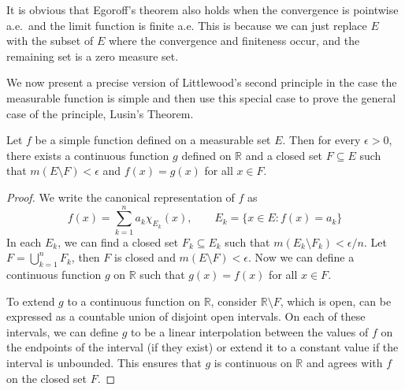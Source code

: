 \documentclass[../main.tex]{subfiles}
\begin{document}
\begin{remark}
	It is obvious that Egoroff's theorem also holds when the convergence is pointwise a.e.\ and the limit function is finite a.e. This is because we can just replace $E$ with the subset of $E$ where the convergence and finiteness occur, and the remaining set is a zero measure set.
\end{remark}

We now present a precise version of Littlewood's second principle in the case the measurable function is simple and then use this special case to prove the general case of the principle, Lusin's Theorem.

\begin{proposition}{}{}
	Let $f$ be a simple function defined on a measurable set $E$. Then for every $\epsilon > 0$, there exists a continuous function $g$ defined on $\mathbb{R}$ and a closed set $F \subseteq E$ such that $m(E \setminus F) < \epsilon$ and $f(x) = g(x)$ for all $x \in F$.
\end{proposition}
\begin{proof}
	We write the canonical representation of $f$ as
	\begin{equation*}
		f(x) = \sum_{k=1}^{n} a_k \chi_{E_k}(x), \qquad E_k = \{x \in E : f(x) = a_k\}
	\end{equation*}
	In each $E_k$, we can find a closed set $F_k \subseteq E_k$ such that $m(E_k \setminus F_k) < \epsilon/n$. Let $F = \bigcup_{k=1}^{n} F_k$, then $F$ is closed and $m(E \setminus F) < \epsilon$. Now we can define a continuous function $g$ on $\mathbb{R}$ such that $g(x) = f(x)$ for all $x \in F$.

	To extend $g$ to a continuous function on $\mathbb{R}$, consider $\mathbb{R} \setminus F$, which is open, can be expressed as a countable union of disjoint open intervals. On each of these intervals, we can define $g$ to be a linear interpolation between the values of $f$ on the endpoints of the interval (if they exist) or extend it to a constant value if the interval is unbounded. This ensures that $g$ is continuous on $\mathbb{R}$ and agrees with $f$ on the closed set $F$.
\end{proof}
\end{document}
